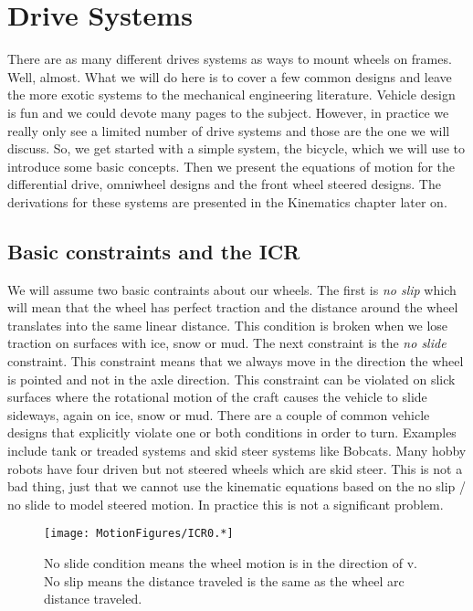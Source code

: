 \hypertarget{drive-systems}{%
\section{Drive Systems}\label{drive-systems}}

There are as many different drives systems as ways to mount wheels on
frames. Well, almost. What we will do here is to cover a few common
designs and leave the more exotic systems to the mechanical engineering
literature. Vehicle design is fun and we could devote many pages to the
subject. However, in practice we really only see a limited number of
drive systems and those are the one we will discuss. So, we get started
with a simple system, the bicycle, which we will use to introduce some
basic concepts. Then we present the equations of motion for the
differential drive, omniwheel designs and the front wheel steered
designs. The derivations for these systems are presented in the
Kinematics chapter later on.

\hypertarget{basic-constraints-and-the-icr}{%
\subsection{Basic constraints and the
ICR}\label{basic-constraints-and-the-icr}}

We will assume two basic contraints about our wheels. The first is
\emph{no slip} which will mean that the wheel has perfect traction and
the distance around the wheel translates into the same linear distance.
This condition is broken when we lose traction on surfaces with ice,
snow or mud. The next constraint is the \emph{no slide} constraint. This
constraint means that we always move in the direction the wheel is
pointed and not in the axle direction. This constraint can be violated
on slick surfaces where the rotational motion of the craft causes the
vehicle to slide sideways, again on ice, snow or mud. There are a couple
of common vehicle designs that explicitly violate one or both conditions
in order to turn. Examples include tank or treaded systems and skid
steer systems like Bobcats. Many hobby robots have four driven but not
steered wheels which are skid steer. This is not a bad thing, just that
we cannot use the kinematic equations based on the no slip / no slide to
model steered motion. In practice this is not a significant problem.

\begin{figure}
\centering
\texttt{[image: MotionFigures/ICR0.*]}
\caption{No slide condition means the wheel motion is in the direction
of v. No slip means the distance traveled is the same as the wheel arc
distance traveled.}
\end{figure}


